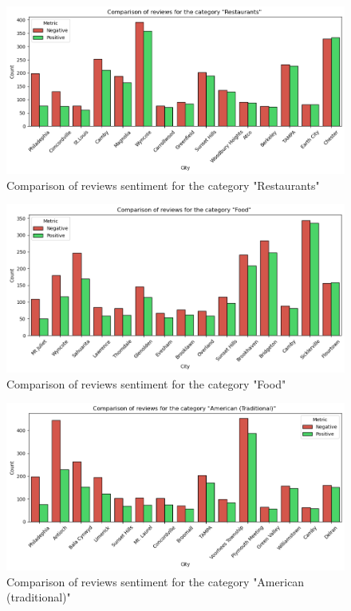 \documentclass{Configuration_Files/PoliMi3i_thesis}
\begin{document}
\bigskip

\begin{figure}[H]
    \centering
    \includegraphics[width=\columnwidth]{imgs/query_8a.png}
    \caption{Comparison of reviews sentiment for the category "Restaurants"}
    \label{fig:query_8a}
\end{figure}

\bigskip

\begin{figure}[H]
    \centering
    \includegraphics[width=\columnwidth ]{imgs/query_8b.png}
    \caption{Comparison of reviews sentiment for the category "Food"}
    \label{fig:query_8b}
\end{figure}

\bigskip

\begin{figure}[H]
    \centering
    \includegraphics[width=\columnwidth]{imgs/query_8c.png}
    \caption{Comparison of reviews sentiment for the category "American (traditional)"}
    \label{fig:query_8c}
\end{figure}
\end{document}
